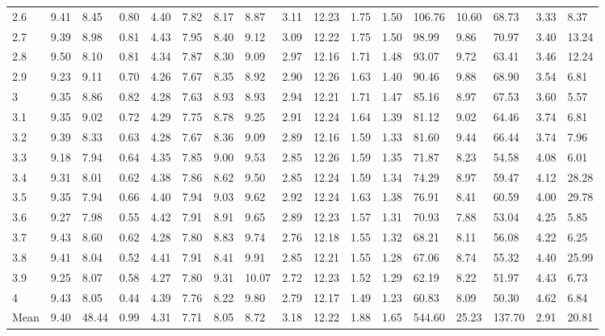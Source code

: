 \begin{adjustbox}{angle=90}
\begin{center}
\begin{tabular}{|l|llllllllllllllll|}
2.6&9.41&8.45&0.80&4.40&7.82&8.17&8.87&3.11&12.23&1.75&1.50&106.76&10.60&68.73&3.33&8.37  \\ 
2.7&9.39&8.98&0.81&4.43&7.95&8.40&9.12&3.09&12.22&1.75&1.50&98.99&9.86&70.97&3.40&13.24  \\ 
2.8&9.50&8.10&0.81&4.34&7.87&8.30&9.09&2.97&12.16&1.71&1.48&93.07&9.72&63.41&3.46&12.24  \\ 
2.9&9.23&9.11&0.70&4.26&7.67&8.35&8.92&2.90&12.26&1.63&1.40&90.46&9.88&68.90&3.54&6.81  \\ 
3&9.35&8.86&0.82&4.28&7.63&8.93&8.93&2.94&12.21&1.71&1.47&85.16&8.97&67.53&3.60&5.57  \\ 
3.1&9.35&9.02&0.72&4.29&7.75&8.78&9.25&2.91&12.24&1.64&1.39&81.12&9.02&64.46&3.74&6.81  \\ 
3.2&9.39&8.33&0.63&4.28&7.67&8.36&9.09&2.89&12.16&1.59&1.33&81.60&9.44&66.44&3.74&7.96  \\ 
3.3&9.18&7.94&0.64&4.35&7.85&9.00&9.53&2.85&12.26&1.59&1.35&71.87&8.23&54.58&4.08&6.01  \\ 
3.4&9.31&8.01&0.62&4.38&7.86&8.62&9.50&2.85&12.24&1.59&1.34&74.29&8.97&59.47&4.12&28.28  \\ 
3.5&9.35&7.94&0.66&4.40&7.94&9.03&9.62&2.92&12.24&1.63&1.38&76.91&8.41&60.59&4.00&29.78  \\ 
3.6&9.27&7.98&0.55&4.42&7.91&8.91&9.65&2.89&12.23&1.57&1.31&70.93&7.88&53.04&4.25&5.85  \\ 
3.7&9.43&8.60&0.62&4.28&7.80&8.83&9.74&2.76&12.18&1.55&1.32&68.21&8.11&56.08&4.22&6.25  \\ 
3.8&9.41&8.04&0.52&4.41&7.91&8.41&9.91&2.85&12.21&1.55&1.28&67.06&8.74&55.32&4.40&25.99  \\ 
3.9&9.25&8.07&0.58&4.27&7.80&9.31&10.07&2.72&12.23&1.52&1.29&62.19&8.22&51.97&4.43&6.73  \\ 
4&9.43&8.05&0.44&4.39&7.76&8.22&9.80&2.79&12.17&1.49&1.23&60.83&8.09&50.30&4.62&6.84  \\ \hline \hline
Mean&9.40&48.44&0.99&4.31&7.71&8.05&8.72&3.18&12.22&1.88&1.65&544.60&25.23&137.70&2.91&20.81  \\ \hline
\end{tabular}
\end{center}
\end{adjustbox}





